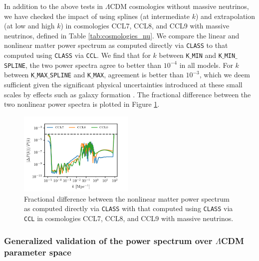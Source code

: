 \documentclass[\docopts]{\docclass}
\newcommand{\ccl}{{\tt CCL}\xspace}
\newcommand{\class}{{\tt CLASS}\xspace}
\begin{document}
In addition to the above tests in $\Lambda$CDM cosmologies without massive neutrinos, we have checked the impact of using splines (at intermediate $k$) and extrapolation (at low and high $k$) in cosmologies CCL7, CCL8, and CCL9 with massive neutrinos, defined in Table \ref{tab:cosmologies_nu}. We compare the linear and nonlinear matter power spectrum as computed directly via \class to that computed using \class via \ccl . We find that for $k$  between {\tt K$\_$MIN} and {\tt K$\_$MIN$\_$SPLINE}, the two power spectra agree to better than $10^{-4}$ in all models. For $k$ between {\tt K$\_$MAX$\_$SPLINE} and {\tt K$\_$MAX}, agreement is better than $10^{-3}$, which we deem sufficient given the significant physical uncertainties introduced at these small scales by effects such as galaxy formation \citep{vanDaalen11}. The fractional difference between the two nonlinear power spectra is plotted in Figure \ref{fig:power_nu}. 

\begin{figure}
\centering
\includegraphics[width=0.49\textwidth]{pk_class_nu_NL}
\caption{Fractional difference between the nonlinear matter power spectrum as computed directly via \class with that computed using \class via \ccl in cosmologies CCL7, CCL8, and CCL9 with massive neutrinos.}
\label{fig:power_nu}
\end{figure}

\subsubsection{Generalized validation of the power spectrum over $\Lambda$CDM parameter space}
\label{ss:classval2}
\end{document}
